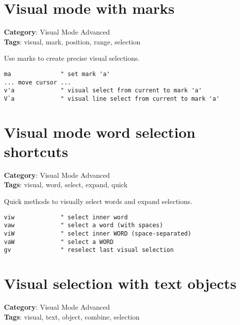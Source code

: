 {{{{{{{{{{{{{{{{{{\section{Visual mode with marks}

\textbf{Category}: Visual Mode Advanced\\ \textbf{Tags}: visual, mark, position, range, selection
\vspace{0.5cm}

Use marks to create precise visual selections.

\begin{Exa*}{}
\begin{Verbatim}[fontsize=\footnotesize, breaklines, breakanywhere]
ma              " set mark 'a'
... move cursor ...
v'a             " visual select from current to mark 'a'
V`a             " visual line select from current to mark 'a'
\end{Verbatim}
\end{Exa*}

\section{Visual mode word selection shortcuts}

\textbf{Category}: Visual Mode Advanced\\ \textbf{Tags}: visual, word, select, expand, quick
\vspace{0.5cm}

Quick methods to visually select words and expand selections.

\begin{Exa*}{}
\begin{Verbatim}[fontsize=\footnotesize, breaklines, breakanywhere]
viw             " select inner word
vaw             " select a word (with spaces)
viW             " select inner WORD (space-separated)  
vaW             " select a WORD
gv              " reselect last visual selection
\end{Verbatim}
\end{Exa*}

\section{Visual selection with text objects}

\textbf{Category}: Visual Mode Advanced\\ \textbf{Tags}: visual, text, object, combine, selection
\vspace{0.5cm}

}}}}}}}}}}}}}}}}}}
